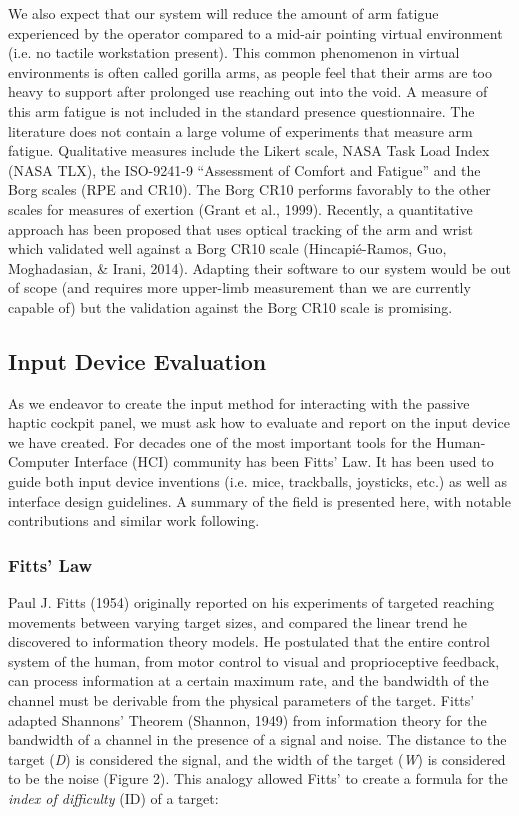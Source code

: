 We also expect that our system will reduce the amount of arm fatigue experienced by the operator compared to a mid-air pointing virtual environment (i.e. no tactile workstation present). This common phenomenon in virtual environments is often called gorilla arms, as people feel that their arms are too heavy to support after prolonged use reaching out into the void. A measure of this arm fatigue is not included in the standard presence questionnaire. The literature does not contain a large volume of experiments that measure arm fatigue.  Qualitative measures include the Likert scale, NASA Task Load Index (NASA TLX), the ISO-9241-9 ``Assessment of Comfort and Fatigue'' and the Borg scales (RPE and CR10). The Borg CR10 performs favorably to the other scales for measures of exertion (Grant et al., 1999). Recently, a quantitative approach has been proposed that uses optical tracking of the arm and wrist which validated well against a Borg CR10 scale (Hincapié-Ramos, Guo, Moghadasian, \& Irani, 2014). Adapting their software to our system would be out of scope (and requires more upper-limb measurement than we are currently capable of) but the validation against the Borg CR10 scale is promising.

\subsection{Input Device Evaluation}
\label{input-device-evaluation}

As we endeavor to create the input method for interacting with the passive haptic cockpit panel, we must ask how to evaluate and report on the input device we have created. For decades one of the most important tools for the Human-Computer Interface (HCI) community has been Fitts' Law. It has been used to guide both input device inventions (i.e. mice, trackballs, joysticks, etc.) as well as interface design guidelines. A summary of the field is presented here, with notable contributions and similar work following.

\subsubsection{Fitts' Law}
\label{fitts-law}

Paul J. Fitts (1954) originally reported on his experiments of targeted reaching movements between varying target sizes, and compared the linear trend he discovered to information theory models. He postulated that the entire control system of the human, from motor control to visual and proprioceptive feedback, can process information at a certain maximum rate, and the bandwidth of the channel must be derivable from the physical parameters of the target. Fitts' adapted Shannons' Theorem (Shannon, 1949) from information theory for the bandwidth of a channel in the presence of a signal and noise. The distance to the target (\emph{D}) is considered the signal, and the width of the target (\emph{W}) is considered to be the noise (Figure 2). This analogy allowed Fitts' to create a formula for the \emph{index of difficulty} (\(\text{ID}\)) of a target:

